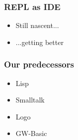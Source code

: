 \begin{frame}
\frametitle{REPL as IDE}

\begin{itemize}
\item Still nascent...
\item ...getting better
\end{itemize}

\end{frame}

\begin{frame}
\frametitle{Our predecessors}

\begin{itemize}
\item Lisp
\item Smalltalk
\item Logo
\item GW-Basic
\end{itemize}

\end{frame}


